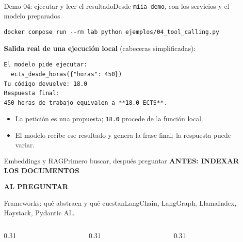 \begin{frame}[fragile]{Demo 04: ejecutar y leer el resultado}{Desde \texttt{miia-demo}, con los servicios y el modelo preparados}
	\begin{lstlisting}[language={}]
docker compose run --rm lab python ejemplos/04_tool_calling.py
\end{lstlisting}
	{\footnotesize\textbf{Salida real de una ejecución local} (cabeceras simplificadas):}
	\begin{lstlisting}[language={}]
El modelo pide ejecutar:
  ects_desde_horas({"horas": 450})
Tu código devuelve: 18.0
Respuesta final:
450 horas de trabajo equivalen a **18.0 ECTS**.
\end{lstlisting}
	\begin{itemize}
		\footnotesize
		\item La petición es una propuesta; \texttt{18.0} procede de la función local.
		\item El modelo recibe ese resultado y genera la frase final; la respuesta puede variar.
	\end{itemize}
\end{frame}

\begin{frame}{Embeddings y RAG}{Primero buscar, después preguntar}
	{\scriptsize\bfseries\color{rojoUGR} ANTES: INDEXAR LOS DOCUMENTOS}\par\vspace{-4pt}
	{\scriptsize\bfseries\color{rojoUGR} AL PREGUNTAR}\par\vspace{-4pt}
\end{frame}

\begin{frame}{Frameworks: qué abstraen y qué cuestan}{LangChain, LangGraph, LlamaIndex, Haystack, Pydantic AI\ldots}
	\begin{columns}[T]
		\begin{column}{0.31\textwidth}
		\end{column}
		\begin{column}{0.31\textwidth}
		\end{column}
		\begin{column}{0.31\textwidth}
		\end{column}
	\end{columns}
\end{frame}

